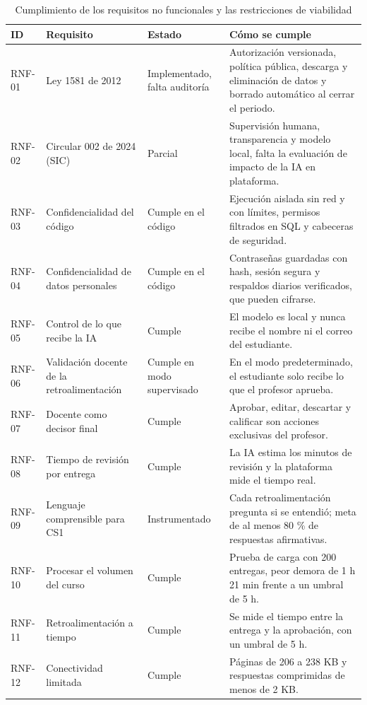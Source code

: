 \documentclass[letterpaper, 10 pt, conference]{ieeeconf}
\begin{document}
\begin{table}[t]
\centering
\footnotesize
\caption{Cumplimiento de los requisitos no funcionales y las restricciones de viabilidad}
\label{tab:cumplimiento_rnf}
\begin{tabular}{|p{1.2cm}|p{4.6cm}|p{2.2cm}|p{8.2cm}|}
\hline
\textbf{ID} & \textbf{Requisito} & \textbf{Estado} & \textbf{Cómo se cumple} \\
\hline
RNF-01 & Ley 1581 de 2012 & Implementado, falta auditoría & Autorización versionada, política pública, descarga y eliminación de datos y borrado automático al cerrar el periodo. \\ \hline
RNF-02 & Circular 002 de 2024 (SIC) & Parcial & Supervisión humana, transparencia y modelo local, falta la evaluación de impacto de la IA en plataforma. \\ \hline
RNF-03 & Confidencialidad del código & Cumple en el código & Ejecución aislada sin red y con límites, permisos filtrados en SQL y cabeceras de seguridad. \\ \hline
RNF-04 & Confidencialidad de datos personales & Cumple en el código & Contraseñas guardadas con hash, sesión segura y respaldos diarios verificados, que pueden cifrarse. \\ \hline
RNF-05 & Control de lo que recibe la IA & Cumple & El modelo es local y nunca recibe el nombre ni el correo del estudiante. \\ \hline
RNF-06 & Validación docente de la retroalimentación & Cumple en modo supervisado & En el modo predeterminado, el estudiante solo recibe lo que el profesor aprueba. \\ \hline
RNF-07 & Docente como decisor final & Cumple & Aprobar, editar, descartar y calificar son acciones exclusivas del profesor. \\ \hline
RNF-08 & Tiempo de revisión por entrega & Cumple & La IA estima los minutos de revisión y la plataforma mide el tiempo real. \\ \hline
RNF-09 & Lenguaje comprensible para CS1 & Instrumentado & Cada retroalimentación pregunta si se entendió; meta de al menos 80 \% de respuestas afirmativas. \\ \hline
RNF-10 & Procesar el volumen del curso & Cumple & Prueba de carga con 200 entregas, peor demora de 1 h 21 min frente a un umbral de 5 h. \\ \hline
RNF-11 & Retroalimentación a tiempo & Cumple & Se mide el tiempo entre la entrega y la aprobación, con un umbral de 5 h. \\ \hline
RNF-12 & Conectividad limitada & Cumple & Páginas de 206 a 238 KB y respuestas comprimidas de menos de 2 KB. \\ \hline

\end{tabular}
\end{table}
\end{document}
